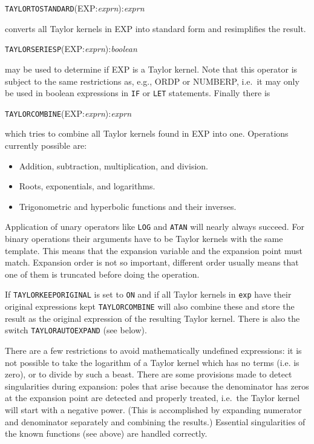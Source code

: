 \hspace*{2em} {\tt TAYLORTOSTANDARD}(EXP:{\em exprn}):{\em exprn}

converts all Taylor kernels in EXP into standard form and
 resimplifies the result.

\hspace*{2em} {\tt TAYLORSERIESP}(EXP:{\em exprn}):{\em boolean}

may be used to determine if EXP is a Taylor kernel.
 Note that this operator is subject to the same
restrictions as, e.g., ORDP or NUMBERP, i.e.\ it may only be used in
boolean expressions in \verb|IF| or \verb|LET| statements.  Finally
there is

\hspace*{2em} {\tt TAYLORCOMBINE}(EXP:{\em exprn}):{\em exprn}

which tries to combine all Taylor kernels found in EXP into one.
Operations currently possible are:
\begin{itemize}
  \item Addition, subtraction, multiplication, and division.
  \item Roots, exponentials, and logarithms.
  \item Trigonometric and hyperbolic functions and their inverses.
\end{itemize}
Application of unary operators like \verb|LOG| and \verb|ATAN| will
nearly always succeed. For binary operations their arguments have to be
Taylor kernels with the same template. This means that the expansion
variable and the expansion point must match. Expansion order is not so
important, different order usually means that one of them is truncated
before doing the operation.

 
If \verb|TAYLORKEEPORIGINAL| is set to \verb|ON| and if all Taylor
kernels in \verb|exp| have their original expressions kept
\verb|TAYLORCOMBINE| will also combine these and store the result
as the original expression of the resulting Taylor kernel.
There is also the switch \verb|TAYLORAUTOEXPAND| (see below).

There are a few restrictions to avoid mathematically undefined
expressions: it is not possible to take the logarithm of a Taylor
kernel which has no terms (i.e. is zero), or to divide by such a
beast.  There are some provisions made to detect singularities during
expansion: poles that arise because the denominator has zeros at the
expansion point are detected and properly treated, i.e.\ the Taylor
kernel will start with a negative power.  (This is accomplished by
expanding numerator and denominator separately and combining the
results.)  Essential singularities of the known functions (see above)
are handled correctly.

